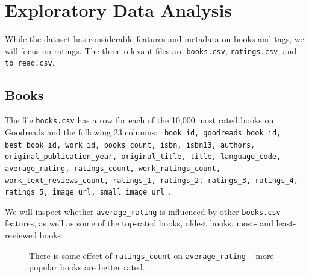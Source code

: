 \documentclass[11pt]{article}
\begin{document}



    \hypertarget{exploratory-data-analysis}{%
\section{Exploratory Data Analysis}\label{exploratory-data-analysis}}
   
   While the dataset has considerable features and metadata on books and tags, we will focus on ratings. The three relevant files are \texttt{books.csv}, \texttt{ratings.csv}, and \texttt{to\_read.csv}.
   
   
   
   
    \hypertarget{books}{%
\subsection{Books}\label{books}}



The file \texttt{books.csv} has a row for each of the 10,000 most rated books on Goodreads and the following 23 columns:
\texttt{
book\_id,
goodreads\_book\_id,
best\_book\_id,
work\_id,          
books\_count,  
isbn,                 
isbn13,             
authors,            
original\_publication\_year,
original\_title,               
title,                        
language\_code,    
average\_rating,     
ratings\_count,       
work\_ratings\_count,
work\_text\_reviews\_count,
ratings\_1,
ratings\_2,
ratings\_3,
ratings\_4,
ratings\_5,
image\_url,
small\_image\_url
}.

We will inspect whether \texttt{average\_rating} is influenced by
other \texttt{books.csv} features, as well as some of the top-rated books, oldest books, most- and least-reviewed books
        
    
\begin{figure}
   \begin{center}
    \end{center}
\caption[Average Rating by Ratings Count]{There is some effect of \texttt{ratings\_count} on
\texttt{average\_rating} -- more popular books are better rated.
     \label{fig:average-rating-ratings-count}
}
\end{figure}    
    
\end{document}
